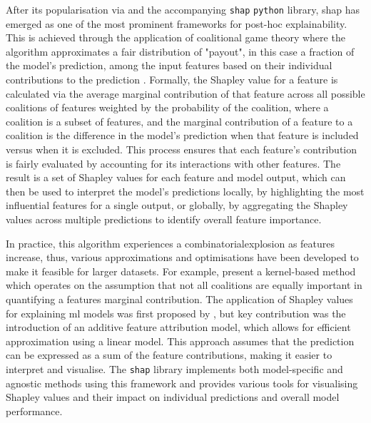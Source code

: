 After its popularisation via \cite{Lundberg2017} and the accompanying \texttt{shap} \texttt{python} library, \acrfull{shap} has emerged as one of the most prominent frameworks for post-hoc explainability. This is achieved through the application of coalitional game theory where the algorithm approximates a fair distribution of "payout", in this case a fraction of the model's prediction, among the input features based on their individual contributions to the prediction \citep{Shapley1953}. Formally, the Shapley value for a feature is calculated via the average marginal contribution of that feature across all possible coalitions of features weighted by the probability of the coalition, where a coalition is a subset of features, and the marginal contribution of a feature to a coalition is the difference in the model's prediction when that feature is included versus when it is excluded. This process ensures that each feature's contribution is fairly evaluated by accounting for its interactions with other features. The result is a set of Shapley values for each feature and model output, which can then be used to interpret the model's predictions locally, by highlighting the most influential features for a single output, or globally, by aggregating the Shapley values across multiple predictions to identify overall feature importance.

In practice, this algorithm experiences a \gls{combinatorialexplosion} as features increase, thus, various approximations and optimisations have been developed to make it feasible for larger datasets. For example, \cite{Lundberg2017} present a kernel-based method which operates on the assumption that not all coalitions are equally important in quantifying a features marginal contribution. The application of Shapley values for explaining \acrshort{ml} models was first proposed by \cite{trumbelj2011}, but \cite{Lundberg2017} key contribution was the introduction of an additive feature attribution model, which allows for efficient approximation using a linear model. This approach assumes that the prediction can be expressed as a sum of the feature contributions, making it easier to interpret and visualise. The \texttt{shap} library implements both model-specific and agnostic methods using this framework and provides various tools for visualising Shapley values and their impact on individual predictions and overall model performance.

